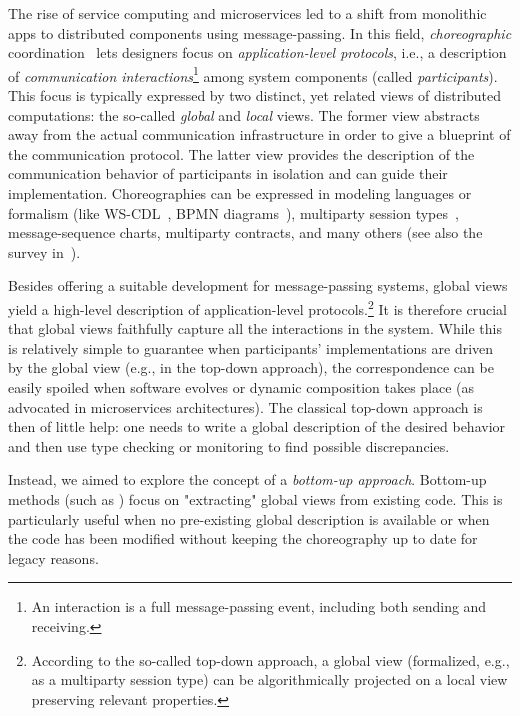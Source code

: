 The rise of service computing and microservices led to a shift from  
monolithic apps to distributed components using message-passing.  
%  
In this field, \emph{choreographic} coordination~\cite{WS-CDL} lets  
designers focus on \emph{application-level protocols}, i.e., a  
description of \emph{communication interactions}\footnote{%
  An interaction is a full message-passing event, including both  
  sending and receiving.} among system components (called  
\emph{participants}).
%
This focus is typically expressed by two distinct, yet related views
of distributed computations: the so-called \emph{global} and
\emph{local} views.
%
The former view abstracts away from the actual communication
infrastructure in order to give a blueprint of the communication
protocol.
%
The latter view provides the description of the communication
behavior of participants in isolation and can guide their
implementation.
Choreographies can be expressed in modeling languages or formalism
(like WS-CDL~\cite{WS-CDL}, BPMN diagrams~\cite{BPMN}),
multiparty session types~\cite{HondaYC16}, message-sequence charts,
multiparty contracts, and many others (see also the survey
in~\cite{Huttel+16}).

Besides offering a suitable development for message-passing systems,
global views yield a high-level description of application-level
protocols.\footnote{According to the so-called top-down approach, a
  global view (formalized, e.g., as a multiparty session type) can be
  algorithmically projected on a local view preserving relevant
  properties.}
%
It is therefore crucial that global views faithfully capture
all the interactions in the system.
%
While this is relatively simple to guarantee when participants'
implementations are driven by the global view (e.g., in the top-down
approach), the correspondence can be easily spoiled when software
evolves or dynamic  composition  takes place (as advocated in
microservices architectures).
%
The classical top-down approach is then of little help: one needs to
write a global description of the desired behavior and then use type
checking or monitoring to find possible discrepancies.

Instead, we aimed to explore the concept of a \textit{bottom-up approach}.  
Bottom-up methods (such as \cite{myh09,lt12,lty15,cflm17,cms18}) focus on  
"extracting" global views from existing code. This is particularly useful  
when no pre-existing global description is available or when the code has  
been modified without keeping the choreography up to date for legacy reasons.  

